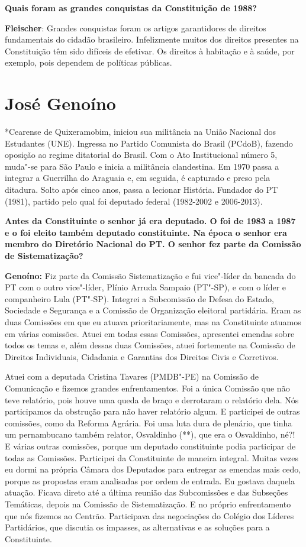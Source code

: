 \textbf{Quais foram as grandes conquistas da Constituição de 1988?}

\textbf{Fleischer}: Grandes conquistas foram os artigos garantidores de
direitos fundamentais do cidadão brasileiro. Infelizmente muitos dos
direitos presentes na Constituição têm sido difíceis de efetivar. Os
direitos à habitação e à saúde, por exemplo, pois dependem de políticas
públicas.

\section{José Genoíno}

*Cearense de Quixeramobim, iniciou sua militância na União Nacional dos
Estudantes (UNE). Ingressa no Partido Comunista do Brasil (PCdoB),
fazendo oposição ao regime ditatorial do Brasil. Com o Ato Institucional
número 5, muda"-se para São Paulo e inicia a militância clandestina. Em
1970 passa a integrar a Guerrilha do Araguaia e, em seguida, é capturado
e preso pela ditadura. Solto após cinco anos, passa a lecionar História.
Fundador do PT (1981), partido pelo qual foi deputado federal (1982-2002
e 2006-2013).

\textbf{Antes da Constituinte o senhor já era deputado. O foi de 1983 a
1987 e o foi eleito também deputado constituinte. Na época o senhor era
membro do Diretório Nacional do PT. O senhor fez parte da Comissão de
Sistematização?}

\textbf{Genoíno:} Fiz parte da Comissão Sistematização e fui vice"-líder
da bancada do PT com o outro vice"-líder, Plínio Arruda Sampaio (PT"-SP),
e com o líder e companheiro Lula (PT"-SP). Integrei a Subcomissão de
Defesa do Estado, Sociedade e Segurança e a Comissão de Organização
eleitoral partidária. Eram as duas Comissões em que eu atuava
prioritariamente, mas na Constituinte atuamos em várias comissões. Atuei
em todas essas Comissões, apresentei emendas sobre todos os temas e,
além dessas duas Comissões, atuei fortemente na Comissão de Direitos
Individuais, Cidadania e Garantias dos Direitos Civis e Corretivos.

Atuei com a deputada Cristina Tavares (PMDB"-PE) na Comissão de
Comunicação e fizemos grandes enfrentamentos. Foi a única Comissão que
não teve relatório, pois houve uma queda de braço e derrotaram o
relatório dela. Nós participamos da obstrução para não haver relatório
algum. E participei de outras comissões, como da Reforma Agrária. Foi
uma luta dura de plenário, que tinha um pernambucano também relator,
Osvaldinho (**), que era o Osvaldinho, né?! E várias outras comissões,
porque um deputado constituinte podia participar de todas as Comissões.
Participei da Constituinte de maneira integral. Muitas vezes eu dormi na
própria Câmara dos Deputados para entregar as emendas mais cedo, porque
as propostas eram analisadas por ordem de entrada. Eu gostava daquela
atuação. Ficava direto até a última reunião das Subcomissões e das
Subseções Temáticas, depois na Comissão de Sistematização. E no próprio
enfrentamento que nós fizemos ao Centrão. Participava das negociações do
Colégio dos Líderes Partidários, que discutia os impasses, as
alternativas e as soluções para a Constituinte.

